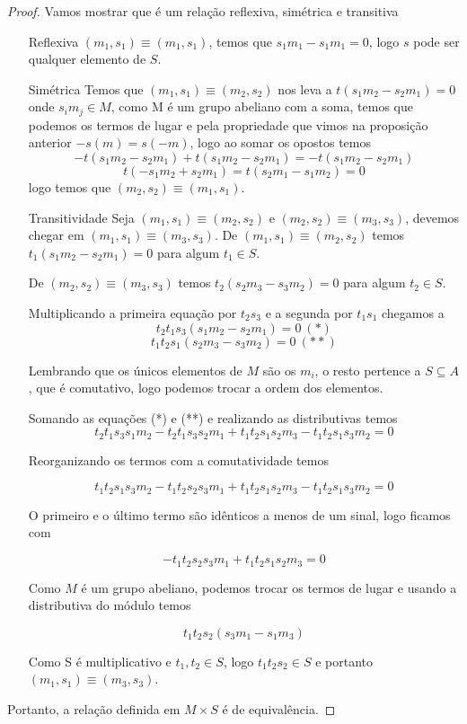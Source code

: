 \documentclass[10pt,a4paper]{article}
\begin{document}
\begin{proof} Vamos mostrar que é um relação reflexiva, simétrica e transitiva
	\begin{enumerate}
		\item [Reflexiva]  $(m_1,s_1) \equiv (m_1, s_1)$, temos que $s_1m_1-s_1m_1=0$, logo $s$ pode ser qualquer elemento de $S$.
		
		
		\item [Simétrica] Temos que $(m_1,s_1) \equiv (m_2, s_2)$ nos leva a $t(s_1m_2-s_2m_1)=0$ onde $s_im_j \in M$, como M é um grupo abeliano com a soma, temos que podemos os termos de lugar e pela propriedade que vimos na proposição anterior $-s(m)=s(-m)$, logo ao somar os opostos temos $$-t(s_1m_2-s_2m_1)+t(s_1m_2-s_2m_1)=-t(s_1m_2-s_2m_1)$$
		$$t(-s_1m_2+s_2m_1)=t(s_2m_1-s_1m_2)=0$$ logo temos que $(m_2,s_2) \equiv (m_1, s_1)$.
		
		
		\item [Transitividade] Seja $(m_1,s_1) \equiv (m_2,s_2)$ e $(m_2,s_2) \equiv (m_3,s_3)$, devemos chegar em $(m_1,s_1) \equiv (m_3,s_3)$.
		De $(m_1,s_1) \equiv (m_2,s_2)$ temos $t_1(s_1m_2-s_2m_1)=0$ para algum $t_1 \in S$.
		
		De $(m_2,s_2) \equiv (m_3,s_3)$ temos $t_2(s_2m_3-s_3m_2)=0$ para algum $t_2 \in S$.
		
		Multiplicando a primeira equação por $t_2s_3$ e a segunda por $t_1s_1$ chegamos a 
		$$t_2t_1s_3(s_1m_2-s_2m_1)=0 \ (*)$$
		$$t_1t_2s_1(s_2m_3-s_3m_2)=0 \ (**)$$
		
		Lembrando que os únicos elementos de $M$ são os $m_i$, o resto pertence a $S \subseteq A$, que é comutativo, logo podemos trocar a ordem dos elementos.
		
		Somando as equações (*) e (**) e realizando as distributivas temos 
		$$t_2t_1s_3s_1m_2-t_2t_1s_3s_2m_1+t_1t_2s_1s_2m_3-t_1t_2s_1s_3m_2=0$$
		
		Reorganizando os termos com a comutatividade temos
		
		$$t_1t_2s_1s_3m_2-t_1t_2s_2s_3m_1+t_1t_2s_1s_2m_3-t_1t_2s_1s_3m_2=0$$
		
		O primeiro e o último termo são idênticos a menos de um sinal, logo ficamos com 
		
		$$-t_1t_2s_2s_3m_1+t_1t_2s_1s_2m_3=0$$
		
		Como $M$ é um grupo abeliano, podemos trocar os termos de lugar e usando a distributiva do módulo temos 
		
		$$t_1t_2s_2(s_3m_1-s_1m_3)$$
		
		Como S é multiplicativo e $t_1, t_2 \in S$, logo $t_1t_2s_2 \in S$ e portanto $(m_1,s_1) \equiv (m_3, s_3)$.
	\end{enumerate}
	
	Portanto, a relação definida em $M \times S$ é de equivalência.
	
\end{proof}
\end{document}
